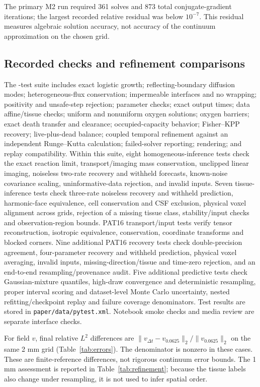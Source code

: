 The primary M2 run required 361 solves and 873 total conjugate-gradient iterations; the largest recorded relative residual was below $10^{-7}$. This residual measures algebraic solution accuracy, not accuracy of the continuum approximation on the chosen grid.

\subsection{Recorded checks and refinement comparisons}
The \TestCount{}-test suite includes exact logistic growth; reflecting-boundary diffusion modes; heterogeneous-flux conservation; impermeable interfaces and no wrapping; positivity and unsafe-step rejection; parameter checks; exact output times; data affine/tissue checks; uniform and nonuniform oxygen solutions; oxygen barriers; exact death transfer and clearance; occupied-capacity behavior; Fisher--KPP recovery; live-plus-dead balance; coupled temporal refinement against an independent Runge--Kutta calculation; failed-solver reporting; rendering; and replay compatibility. Within this suite, eight homogeneous-inference tests check the exact reaction limit, transport/imaging mass conservation, unclipped linear imaging, noiseless two-rate recovery and withheld forecasts, known-noise covariance scaling, uninformative-data rejection, and invalid inputs. Seven tissue-inference tests check three-rate noiseless recovery and withheld prediction, harmonic-face equivalence, cell conservation and CSF exclusion, physical voxel alignment across grids, rejection of a missing tissue class, stability/input checks and observation-region bounds. PAT16 transport/input tests verify tensor reconstruction, isotropic equivalence, conservation, coordinate transforms and blocked corners. Nine additional PAT16 recovery tests check double-precision agreement, four-parameter recovery and withheld prediction, physical voxel averaging, invalid inputs, missing-direction/tissue and time-zero rejection, and an end-to-end resampling/provenance audit. Five additional predictive tests check Gaussian-mixture quantiles, high-draw convergence and deterministic resampling, proper interval scoring and dataset-level Monte Carlo uncertainty, nested refitting/checkpoint replay and failure coverage denominators. Test results are stored in \texttt{paper/data/pytest.xml}. Notebook smoke checks and media review are separate interface checks.

For field $v$, final relative $L^2$ differences are $\|v_{\Delta t}-v_{0.0625}\|_2/\|v_{0.0625}\|_2$ on the same 2 mm grid (Table~\ref{tab:errors}). The denominator is nonzero in these cases. These are finite-reference differences, not rigorous continuum error bounds. The 1 mm assessment is reported in Table~\ref{tab:refinement}; because the tissue labels also change under resampling, it is not used to infer spatial order.

